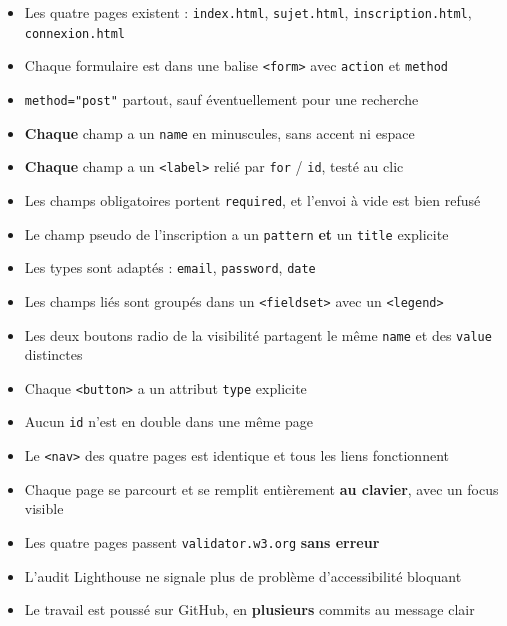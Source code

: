 \documentclass[a4paper,11pt]{article}
\begin{document}
\begin{tcolorbox}[definition, title={Auto-évaluation}]
\begin{itemize}
  \item[$\square$] Les quatre pages existent : \texttt{index.html}, \texttt{sujet.html}, \texttt{inscription.html}, \texttt{connexion.html}
  \item[$\square$] Chaque formulaire est dans une balise \texttt{<form>} avec \texttt{action} et \texttt{method}
  \item[$\square$] \texttt{method="post"} partout, sauf éventuellement pour une recherche
  \item[$\square$] \textbf{Chaque} champ a un \texttt{name} en minuscules, sans accent ni espace
  \item[$\square$] \textbf{Chaque} champ a un \texttt{<label>} relié par \texttt{for} / \texttt{id}, testé au clic
  \item[$\square$] Les champs obligatoires portent \texttt{required}, et l'envoi à vide est bien refusé
  \item[$\square$] Le champ pseudo de l'inscription a un \texttt{pattern} \textbf{et} un \texttt{title} explicite
  \item[$\square$] Les types sont adaptés : \texttt{email}, \texttt{password}, \texttt{date}
  \item[$\square$] Les champs liés sont groupés dans un \texttt{<fieldset>} avec un \texttt{<legend>}
  \item[$\square$] Les deux boutons radio de la visibilité partagent le même \texttt{name} et des \texttt{value} distinctes
  \item[$\square$] Chaque \texttt{<button>} a un attribut \texttt{type} explicite
  \item[$\square$] Aucun \texttt{id} n'est en double dans une même page
  \item[$\square$] Le \texttt{<nav>} des quatre pages est identique et tous les liens fonctionnent
  \item[$\square$] Chaque page se parcourt et se remplit entièrement \textbf{au clavier}, avec un focus visible
  \item[$\square$] Les quatre pages passent \texttt{validator.w3.org} \textbf{sans erreur}
  \item[$\square$] L'audit Lighthouse ne signale plus de problème d'accessibilité bloquant
  \item[$\square$] Le travail est poussé sur GitHub, en \textbf{plusieurs} commits au message clair
\end{itemize}
\end{tcolorbox}
\end{document}
